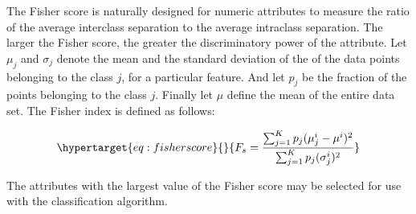 \documentclass[a4paper,conference]{IEEEtran}
\begin{document}
The Fisher score is naturally designed for numeric attributes to measure
the ratio of the average interclass separation to the average intraclass
separation. The larger the Fisher score, the greater the discriminatory
power of the attribute. Let \(\mu_j\) and \(\sigma_j\) denote the mean
and the standard deviation of the of the data points belonging to the
class \(j\), for a particular feature. And let \(p_j\) be the fraction
of the points belonging to the class \(j\). Finally let \(\mu\) define
the mean of the entire data set. The Fisher index is defined as follows:

\begin{equation}\protect\hypertarget{eq:fisherscore}{}{
F_s = \frac{\sum_{j=1}^{K} p_j(\mu_{j}^{i}-\mu^i)^2}{\sum_{j=1}^{K}p_j (\sigma_{j}^i)^{2}}
}\end{equation}

The attributes with the largest value of the Fisher score may be
selected for use with the classification algorithm.
\end{document}
